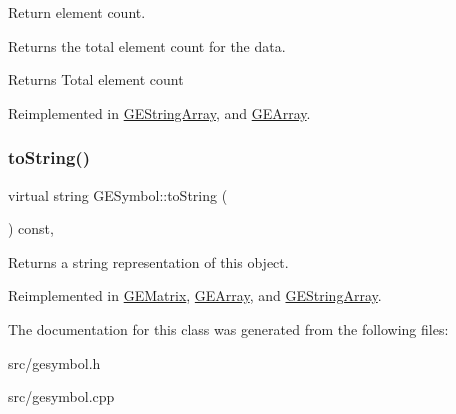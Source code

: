 Return element count. 

Returns the total element count for the data.

\begin{DoxyReturn}{Returns}
Total element count 
\end{DoxyReturn}


Reimplemented in \hyperlink{class_g_e_string_array_ac04d8fa75ee1b940dbe7855dc7d35c25}{G\+E\+String\+Array}, and \hyperlink{class_g_e_array_aedc9a359a4353dd8a430b048d526ce1f}{G\+E\+Array}.

\mbox{\label{class_g_e_symbol_a5c0d4c23b20574c28bddfe234409aa37}} 
\subsubsection{\texorpdfstring{to\+String()}{toString()}}
{\footnotesize\ttfamily virtual string G\+E\+Symbol\+::to\+String (\begin{DoxyParamCaption}{ }\end{DoxyParamCaption}) const\hspace{0.3cm}{\ttfamily [inline]}, {\ttfamily [virtual]}}



Returns a string representation of this object. 



Reimplemented in \hyperlink{class_g_e_matrix_a698481e17b01b981ce483ebab3058d0b}{G\+E\+Matrix}, \hyperlink{class_g_e_array_a9f5b44db0f65c13c2ac15dc119b81459}{G\+E\+Array}, and \hyperlink{class_g_e_string_array_abfb8d92b23e04bfedf6683138f533e62}{G\+E\+String\+Array}.



The documentation for this class was generated from the following files\+:\begin{DoxyCompactItemize}
\item 
src/gesymbol.\+h\item 
src/gesymbol.\+cpp\end{DoxyCompactItemize}
